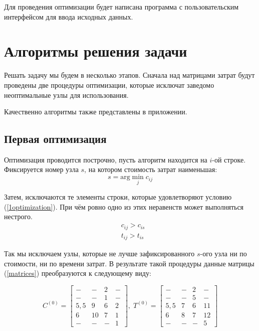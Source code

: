 	Для проведения оптимизации будет написана программа с пользовательским интерфейсом для ввода исходных данных. 
	\newpage
	
	\section{Алгоритмы решения задачи}
	
	Решать задачу мы будем в несколько этапов. Сначала над матрицами затрат будут проведены две процедуры оптимизации, которые исключат заведомо неоптимальные узлы для использования.
	
	Качественно алгоритмы также представлены в приложении.
	
	\subsection{Первая оптимизация}
	
	Оптимизация проводится построчно, пусть алгоритм находится на $i$-ой строке. Фиксируется номер узла $s$, на котором стоимость затрат наименьшая: 
	\begin{equation*}
		s = \mathrm{arg} \min_{j} c_{ij}
	\end{equation*}
	
	Затем, исключаются те элементы строки, которые удовлетворяют условию (\ref{1optimization}). При чём ровно одно из этих неравенств может выполняться нестрого. 
	\begin{equation}
		\begin{aligned}
			& c_{ij} > c_{is} \\
			& t_{ij} > t_{is}
		\end{aligned}
		\label{1optimization}
	\end{equation}
	
	Так мы исключаем узлы, которые не лучше зафиксированного $s$-ого узла ни по стоимости, ни по времени затрат. В результате такой процедуры данные матрицы (\ref{matrices}) преобразуются к следующему виду:
	
	\begin{equation}
		C^{(0)} = \begin{bmatrix*}
			-   & -  & 2 & - \\
			-   & -  & 1 & - \\
			5,5 & 9  & 6 & 2 \\
			6   & 10 & 7 & 1 \\
			-   & -  & - & 1
		\end{bmatrix*},\;
		T^{(0)} = \begin{bmatrix*}
			-   & - & 2 & -  \\
			-   & - & 5 & - \\
			5,5 & 7 & 6 & 11 \\
			6   & 8 & 7 & 12 \\
			-   & - & - & 5
		\end{bmatrix*}
		\label{matrices0}
	\end{equation}
	

